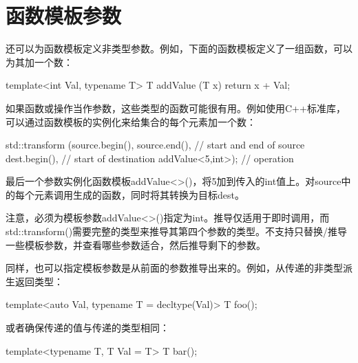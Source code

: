 \section{函数模板参数}
还可以为函数模板定义非类型参数。例如，下面的函数模板定义了一组函数，可以为其加一个数：

\begin{cpp}
template<int Val, typename T>
T addValue (T x)
{
	return x + Val;
}
\end{cpp}

如果函数或操作当作参数，这些类型的函数可能很有用。例如使用C++标准库，可以通过函数模板的实例化来给集合的每个元素加一个数：

\begin{cpp}
std::transform (source.begin(), source.end(), // start and end of source
dest.begin(), // start of destination
addValue<5,int>); // operation
\end{cpp}

最后一个参数实例化函数模板addValue<>()，将5加到传入的int值上。对source中的每个元素调用生成的函数，同时将其转换为目标dest。

注意，必须为模板参数addValue<>()指定为int。推导仅适用于即时调用，而std::transform()需要完整的类型来推导其第四个参数的类型。不支持只替换/推导一些模板参数，并查看哪些参数适合，然后推导剩下的参数。

同样，也可以指定模板参数是从前面的参数推导出来的。例如，从传递的非类型派生返回类型：

\begin{cpp}
template<auto Val, typename T = decltype(Val)>
T foo();
\end{cpp}

或者确保传递的值与传递的类型相同：

\begin{cpp}
template<typename T, T Val = T{}>
T bar();
\end{cpp}































